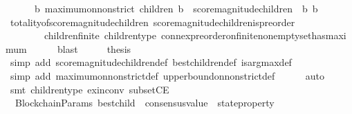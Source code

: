\begin{isabellebody}
\ \ \ \ {\isasymlongrightarrow}\ {\isacharparenleft}{\isasymexists}\ b{\isacharprime}{\isachardot}\ maximum{\isacharunderscore}on{\isacharunderscore}non{\isacharunderscore}strict\ {\isacharparenleft}children\ {\isacharparenleft}b{\isacharcomma}\ {\isasymsigma}{\isacharparenright}{\isacharparenright}\ {\isacharparenleft}score{\isacharunderscore}magnitude{\isacharunderscore}children\ {\isasymsigma}\ b{\isacharparenright}\ b{\isacharprime}{\isacharparenright}{\isachardoublequoteclose}\ \ \isanewline
\ \ \ \ \isamarkupfalse%
\ totality{\isacharunderscore}of{\isacharunderscore}score{\isacharunderscore}magnitude{\isacharunderscore}children\ score{\isacharunderscore}magnitude{\isacharunderscore}children{\isacharunderscore}is{\isacharunderscore}preorder\isanewline
\ \ \ \ \ \ \ \ children{\isacharunderscore}finite\ children{\isacharunderscore}type\ connex{\isacharunderscore}preorder{\isacharunderscore}on{\isacharunderscore}finite{\isacharunderscore}non{\isacharunderscore}empty{\isacharunderscore}set{\isacharunderscore}has{\isacharunderscore}maximum\isanewline
\ \ \ \ \isamarkupfalse%
\ blast\isanewline
\ \ \isamarkupfalse%
\ \isamarkupfalse%
\ {\isacharquery}thesis\isanewline
\ \ \ \ \isamarkupfalse%
\ {\isacharparenleft}simp\ add{\isacharcolon}\ score{\isacharunderscore}magnitude{\isacharunderscore}children{\isacharunderscore}def\ best{\isacharunderscore}children{\isacharunderscore}def\ is{\isacharunderscore}arg{\isacharunderscore}max{\isacharunderscore}def{\isacharparenright}\isanewline
\ \ \ \ \isamarkupfalse%
\ {\isacharparenleft}simp\ add{\isacharcolon}\ maximum{\isacharunderscore}on{\isacharunderscore}non{\isacharunderscore}strict{\isacharunderscore}def\ upper{\isacharunderscore}bound{\isacharunderscore}on{\isacharunderscore}non{\isacharunderscore}strict{\isacharunderscore}def{\isacharparenright}\isanewline
\ \ \ \ \isamarkupfalse%
\ auto\isanewline
\ \ \ \ \isamarkupfalse%
\ {\isacharparenleft}smt\ children{\isacharunderscore}type\ ex{\isacharunderscore}in{\isacharunderscore}conv\ subsetCE{\isacharparenright}\isanewline
{}\isamarkupfalse%
%
\endisatagproof
{\isafoldproof}%
%
\isadelimproof
\isanewline
%
\endisadelimproof
\isanewline
\isanewline
{}\isamarkupfalse%
\ {\isacharparenleft}\ BlockchainParams{\isacharparenright}\ best{\isacharunderscore}child\ {\isacharcolon}{\isacharcolon}\ {\isachardoublequoteopen}consensus{\isacharunderscore}value\ {\isasymRightarrow}\ state{\isacharunderscore}property{\isachardoublequoteclose}\isanewline

\end{isabellebody}
